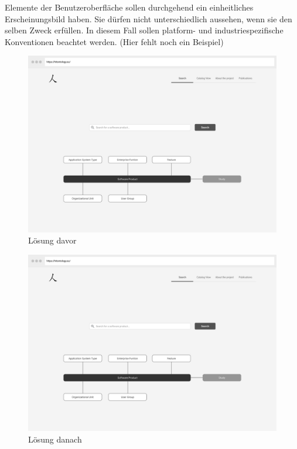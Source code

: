 \begin{enumerate}
Elemente der Benutzeroberfläche sollen durchgehend ein einheitliches Erscheinungsbild haben.
Sie dürfen nicht unterschiedlich aussehen, wenn sie den selben Zweck erfüllen.
In diesem Fall sollen platform- und industriespezifische Konventionen beachtet werden.
(Hier fehlt noch ein Beispiel)

\begin{figure}[H]
	\centering
    	\includegraphics[width=1.45\textwidth, angle=-90]{Images/Startseite}
   	\caption{Lösung davor}
   	\label{fig:wireframe_start}
\end{figure}

\begin{figure}[H]
	\centering
    	\includegraphics[width=1.45\textwidth, angle=-90]{Images/Startseite}
   	\caption{Lösung danach}
   	\label{fig:wireframe_start}
\end{figure}


\end{enumerate}
